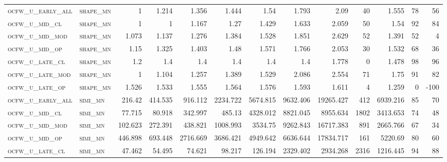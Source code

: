 \begin{landscape}
\begin{center}
\begin{footnotesize}
\begin{longtable}{llrrrrrrrr|rrr}
\textsc{ocfw\_u\_early\_all} & \textsc{shape\_mn }   & 1        & 1.214    & 1.356    & 1.444    & 1.54     & 1.793    & 2.09      & 40     & 1.555         & 78            & 56              \\
\textsc{ocfw\_u\_mid\_cl   } & \textsc{shape\_mn }   & 1        & 1        & 1.167    & 1.27     & 1.429    & 1.633    & 2.059     & 50     & 1.54          & 92            & 84              \\
\textsc{ocfw\_u\_mid\_mod  } & \textsc{shape\_mn }   & 1.073    & 1.137    & 1.276    & 1.384    & 1.528    & 1.851    & 2.629     & 52     & 1.391         & 52            & 4               \\
\textsc{ocfw\_u\_mid\_op   } & \textsc{shape\_mn }   & 1.15     & 1.325    & 1.403    & 1.48     & 1.571    & 1.766    & 2.053     & 30     & 1.532         & 68            & 36              \\
\textsc{ocfw\_u\_late\_cl  } & \textsc{shape\_mn }   & 1.2      & 1.4      & 1.4      & 1.4      & 1.4      & 1.4      & 1.778     & 0      & 1.478         & 98            & 96              \\
\textsc{ocfw\_u\_late\_mod } & \textsc{shape\_mn }   & 1        & 1.104    & 1.257    & 1.389    & 1.529    & 2.086    & 2.554     & 71     & 1.75          & 91            & 82              \\
\textsc{ocfw\_u\_late\_op  } & \textsc{shape\_mn }   & 1.526    & 1.533    & 1.555    & 1.564    & 1.576    & 1.593    & 1.611     & 4      & 1.259         & 0             & -100            \\
\textsc{ocfw\_u\_early\_all} & \textsc{simi\_mn  }   & 216.42   & 414.535  & 916.112  & 2234.722 & 5674.815 & 9632.406 & 19265.427 & 412    & 6939.216      & 85            & 70              \\
\textsc{ocfw\_u\_mid\_cl   } & \textsc{simi\_mn  }   & 77.715   & 80.918   & 342.997  & 485.13   & 4328.012 & 8821.045 & 8955.634  & 1802   & 3413.653      & 74            & 48              \\
\textsc{ocfw\_u\_mid\_mod  } & \textsc{simi\_mn  }   & 102.623  & 272.391  & 438.821  & 1008.993 & 3534.75  & 9262.843 & 16717.383 & 891    & 2665.766      & 67            & 34              \\
\textsc{ocfw\_u\_mid\_op   } & \textsc{simi\_mn  }   & 446.898  & 693.448  & 2716.669 & 3686.421 & 4949.642 & 6636.644 & 17834.717 & 161    & 5220.69       & 80            & 60              \\
\textsc{ocfw\_u\_late\_cl  } & \textsc{simi\_mn  }   & 47.462   & 54.495   & 74.621   & 98.217   & 126.194  & 2329.402 & 2934.268  & 2316   & 1216.445      & 94            & 88              \\

\end{longtable}
\end{footnotesize}
\end{center}
\end{landscape}
